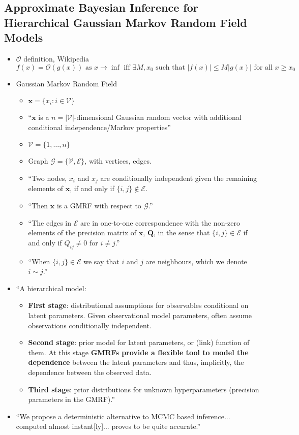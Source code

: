 \documentclass{article}
\begin{document}
\subsection*{Approximate Bayesian Inference for Hierarchical Gaussian Markov Random Field Models \citep{Rue2007}}
\begin{itemize}
\item $\mathcal{O}$ definition, Wikipedia
$$f(x) = \mathcal{O}(g(x)) \text{ as } x \rightarrow \inf \text{ iff } \exists M, x_{0} \text{ such that } |f(x)| \leq M|g(x)| \text{ for all } x \geq x_{0}$$
\item Gaussian Markov Random Field
  \begin{itemize}
  \item $\pmb{x} = \{ x_{i}:i \in \mathscr{V} \}$
  \item ``$\pmb{x}$ is a $n = |\mathscr{V}|$-dimensional Gaussian random vector with additional conditional independence/Markov properties''
  \item $\mathscr{V} = \{1,\dots,n\}$
  \item Graph $\mathscr{G} = \{ \mathscr{V}, \mathscr{E} \}$, with vertices, edges.
  \item ``Two nodes, $x_{i}$ and $x_{j}$ are conditionally independent given the remaining elements of $\pmb{x}$, if and only if $\{i, j\} \notin \mathscr{E}$.
  \item ``Then $\pmb{x}$ is a GMRF with respect to $\mathscr{G}$.''
  \item ``The edges in $\mathscr{E}$ are in one-to-one correspondence with the non-zero elements of the precision matrix of $\pmb{x}$, $\pmb{Q}$, in the sense that $\{ i, j \} \in \mathscr{E}$ if and only if $Q_{ij} \neq 0 \text{ for } i \neq j$.''
  \item ``When $\{i,j\} \in \mathscr{E}$ we say that $i$ and $j$ are neighbours, which we denote $i \sim j$.''
  \end{itemize}

\item ``A hierarchical model:
  \begin{itemize}
  \item {\bf First stage}: distributional assumptions for observables conditional on latent parameters. Given observational model parameters, often assume observations conditionally independent.
  \item {\bf Second stage}: prior model for latent parameters, or (link) function of them. At this stage {\bf GMRFs provide a flexible tool to model the dependence} between the latent parameters and thus, implicitly, the dependence between the observed data.
  \item {\bf Third stage}: prior distributions for unknown hyperparameters (precision parameters in the GMRF).''
  \end{itemize}
\item ``We propose a deterministic alternative to MCMC based inference... computed almost instant[ly]... proves to be quite accurate.''
\end{itemize}
\end{document}
